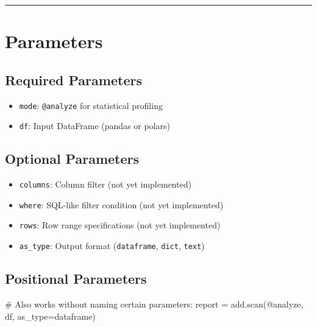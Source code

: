 \documentclass[
  letterpaper,
]{scrbook}
\newenvironment{Shaded}{\begin{snugshade}}{\end{snugshade}}
\newcommand{\CommentTok}[1]{\textcolor[rgb]{0.37,0.37,0.37}{#1}}
\newcommand{\NormalTok}[1]{\textcolor[rgb]{0.00,0.23,0.31}{#1}}
\newcommand{\OperatorTok}[1]{\textcolor[rgb]{0.37,0.37,0.37}{#1}}
\newcommand{\StringTok}[1]{\textcolor[rgb]{0.13,0.47,0.30}{#1}}
\providecommand{\tightlist}{%
  \setlength{\itemsep}{0pt}\setlength{\parskip}{0pt}}
\begin{document}
\begin{center}\rule{0.5\linewidth}{0.5pt}\end{center}

\section{Parameters}\label{parameters-6}

\subsection{Required Parameters}\label{required-parameters-5}

\begin{itemize}
\tightlist
\item
  \texttt{mode}: \texttt{\textquotesingle{}@analyze\textquotesingle{}}
  for statistical profiling
\item
  \texttt{df}: Input DataFrame (pandas or polars)
\end{itemize}

\subsection{Optional Parameters}\label{optional-parameters-5}

\begin{itemize}
\tightlist
\item
  \texttt{columns}: Column filter (not yet implemented)
\item
  \texttt{where}: SQL-like filter condition (not yet implemented)
\item
  \texttt{rows}: Row range specifications (not yet implemented)
\item
  \texttt{as\_type}: Output format
  (\texttt{\textquotesingle{}dataframe\textquotesingle{}},
  \texttt{\textquotesingle{}dict\textquotesingle{}},
  \texttt{\textquotesingle{}text\textquotesingle{}})
\end{itemize}

\subsection{Positional Parameters}\label{positional-parameters-6}

\begin{Shaded}
\begin{Highlighting}[]
\CommentTok{\# Also works without naming certain parameters:}
\NormalTok{report }\OperatorTok{=}\NormalTok{ add.scan(}\StringTok{\textquotesingle{}@analyze\textquotesingle{}}\NormalTok{, df, as\_type}\OperatorTok{=}\StringTok{\textquotesingle{}dataframe\textquotesingle{}}\NormalTok{)}
\end{Highlighting}
\end{Shaded}
\end{document}

